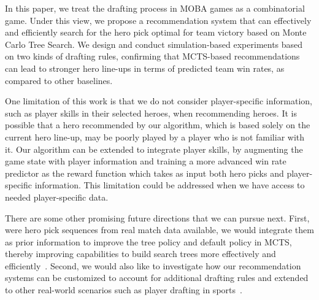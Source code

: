 In this paper, we treat the drafting process in MOBA games as a combinatorial game. Under this view, we propose a recommendation system that can effectively and efficiently search for the hero pick optimal for team victory based on Monte Carlo Tree Search. We design and conduct simulation-based experiments based on two kinds of drafting rules, confirming that MCTS-based recommendations can lead to stronger hero line-ups in terms of predicted team win rates, as compared to other baselines.

One limitation of this work is that we do not consider player-specific information, such as player skills in their selected heroes, when recommending heroes. It is possible that a hero recommended by our algorithm, which is based solely on the current hero line-up, may be poorly played by a player who is not familiar with it. Our algorithm can be extended to integrate player skills, by augmenting the game state with player information and training a more advanced win rate predictor as the reward function which takes as input both hero picks and player-specific information. This limitation could be addressed when we have access to needed player-specific data.

There are some other promising future directions that we can pursue next. First, were hero pick sequences from real match data available, we would integrate them as prior information to improve the tree policy and default policy in MCTS, thereby improving capabilities to build search trees more effectively and efficiently~\cite{gelly2007combining,chaslot2009adding}. Second, we would also like to investigate how our recommendation systems can be customized to account for additional drafting rules and extended to other real-world scenarios such as player drafting in sports~\cite{staw1995sunk}. 
